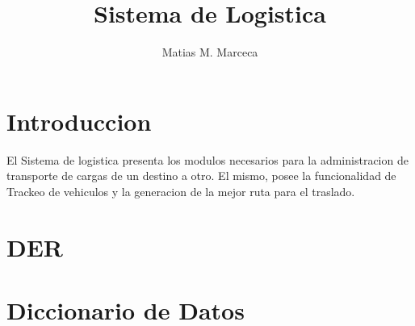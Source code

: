 \documentclass{article}
\title{Sistema de Logistica}
\author{Matias M. Marceca}
\begin{document}
\maketitle

\tableofcontents

\section{Introduccion}
\begin{flushleft}
El Sistema de logistica presenta los modulos necesarios para la administracion de transporte de cargas de un destino a otro. \newline
El mismo, posee la funcionalidad de Trackeo de vehiculos y la generacion de la mejor ruta para el traslado.
\end{flushleft}

\section{DER}

  

\section{Diccionario de Datos}

\setlength{\parindent}{4em}
\setlength{\parskip}{1em}
\renewcommand{\baselinestretch}{1.5}
\end{document}
